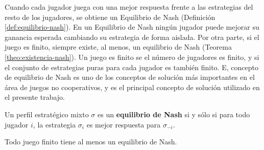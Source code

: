 Cuando cada jugador juega con una mejor respuesta frente a las estrategias del resto de los jugadores, se obtiene un Equilibrio de Nash (Definición \ref{def:equilibrio-nash}). En un Equilibrio de Nash ningún jugador puede mejorar su ganancia esperada cambiando su estrategia de forma aislada. Por otra parte, si el juego es finito, siempre existe, al menos, un equilibrio de Nash (Teorema \ref{theo:existencia-nash}). Un juego es finito se el n\'umero de jugadores es finito, y si el conjunto de estrategias puras para cada jugador es tambi\'en finito. E, concepto de equilibrio de Nash es uno de los conceptos de solución más importantes en el \'area de juegos no cooperativos, y es el principal concepto de solución utilizado en el presente trabajo.

\begin{definition}
\label{def:equilibrio-nash} Un perfil estratégico mixto $\sigma$ es un \textbf{equilibrio de Nash} si y s\'olo si para todo jugador $i$, la estrategia $\sigma_i$ es mejor respuesta para $\sigma_{-i}$.
\end{definition}

\begin{theorem}
\label{theo:existencia-nash}
Todo juego finito tiene al menos un equilibrio de Nash.
\end{theorem}
